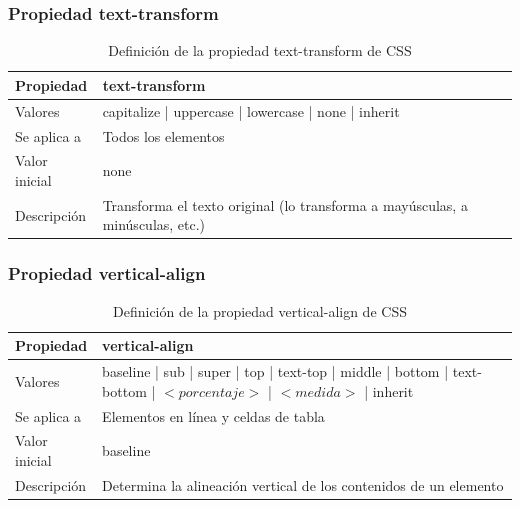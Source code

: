 \begin{frame}
\frametitle{Propiedad text-transform}

\begin{center}
  \begin{table}
   \begin{tabular}{p{1.8cm}p{7.8cm}}
Propiedad & \bf{text-transform} \\ \hline
Valores& capitalize | uppercase | lowercase | none | inherit \\ \hline
Se aplica a& Todos los elementos \\ \hline
Valor inicial& none \\ \hline
Descripción& Transforma el texto original (lo transforma a mayúsculas, a minúsculas, etc.) \\ \hline
  \end{tabular}
   \caption{Definición de la propiedad text-transform de CSS}
 \end{table}
\end{center}


\end{frame}



\begin{frame}
\frametitle{Propiedad vertical-align}

\begin{center}
  \begin{table}
   \begin{tabular}{p{1.8cm}p{7.8cm}}
Propiedad & \bf{vertical-align} \\ \hline
Valores& baseline | sub | super | top | text-top | middle | bottom | text-bottom | $<porcentaje>$ | $<medida>$ | inherit \\ \hline
Se aplica a& Elementos en línea y celdas de tabla \\ \hline
Valor inicial& baseline \\ \hline
Descripción& Determina la alineación vertical de los contenidos de un elemento \\ \hline
  \end{tabular}
   \caption{Definición de la propiedad vertical-align de CSS}
 \end{table}
\end{center}


\end{frame}




